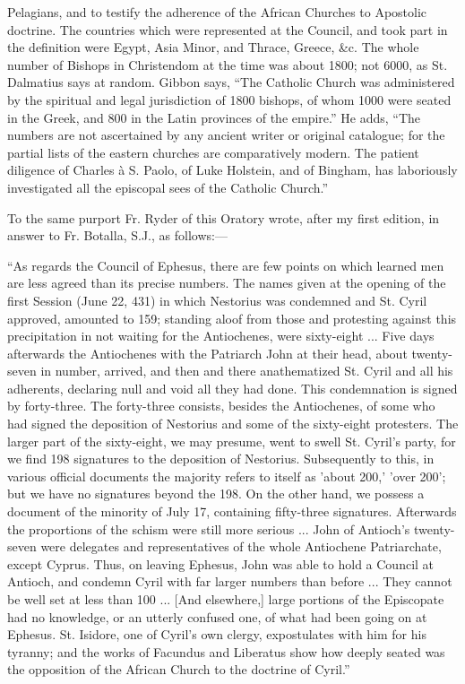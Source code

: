 Pelagians, and to testify the adherence of the African Churches to
Apostolic doctrine. The countries which were represented at the Council,
and took part in the definition were Egypt, Asia Minor, and Thrace,
Greece, \&c. The whole number of Bishops in Christendom at the time
was about 1800; not 6000, as St. Dalmatius says at random. Gibbon says,
``The Catholic Church was administered by the spiritual and legal
jurisdiction of 1800 bishops, of whom 1000 were seated in the Greek, and
800 in the Latin provinces of the empire.'' He adds, ``The
numbers are not ascertained by any ancient writer or original catalogue;
for the partial lists of the eastern churches are comparatively modern.
The patient diligence of Charles à S. Paolo, of Luke Holstein, and of
Bingham, has laboriously investigated all the episcopal sees of the
Catholic Church.''

To the same purport Fr. Ryder of this Oratory wrote, after my first
edition, in answer to Fr. Botalla, S.J., as follows:—

``As regards the Council of Ephesus, there are few points on
which learned men are less agreed than its precise numbers. The names
given at the opening of the first Session (June 22, 431) in which
Nestorius was condemned and St. Cyril approved, amounted to 159;
standing aloof from those and protesting against this precipitation in
not waiting for the Antiochenes, were sixty-eight ... Five days
afterwards the Antiochenes with the Patriarch John at their head, about
twenty-seven in number, arrived, and then and there anathematized St.
Cyril and all his adherents, declaring null and void all they had done.
This condemnation is signed by forty-three. The forty-three consists,
besides the Antiochenes, of some who had signed the deposition of
Nestorius and some of the sixty-eight protesters. The larger part of the
sixty-eight, we may presume, went to swell St. Cyril's party, for we
find 198 signatures to the deposition of Nestorius. Subsequently to
this, in various official documents the majority refers to itself as
'about 200,' 'over 200'; but we have no signatures beyond the 198. On
the other hand, we possess a document of the minority of July 17,
containing fifty-three signatures. Afterwards the proportions of
the schism were still more serious ... John of Antioch's twenty-seven
were delegates and representatives of the whole Antiochene Patriarchate,
except Cyprus. Thus, on leaving Ephesus, John was able to hold a Council
at Antioch, and condemn Cyril with far larger numbers than before ...
They cannot be well set at less than 100 ... [And elsewhere,] large
portions of the Episcopate had no knowledge, or an utterly confused one,
of what had been going on at Ephesus. St. Isidore, one of Cyril's own
clergy, expostulates with him for his tyranny; and the works of Facundus
and Liberatus show how deeply seated was the opposition of the African
Church to the doctrine of Cyril.''

